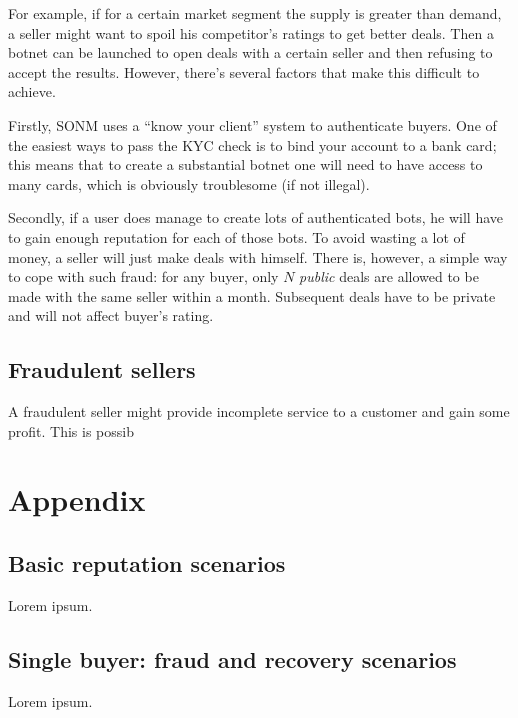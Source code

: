 \documentclass[11pt]{article}
\begin{document}
For example, if for a certain market segment the supply is greater than demand, a seller might want to spoil his competitor's ratings to get better deals. Then a botnet can be launched to open deals with a certain seller and then refusing to accept the results. However, there's several factors that make this difficult to achieve.

Firstly, SONM uses a ``know your client'' system to authenticate buyers. One of the easiest ways to pass the KYC check is to bind your account to a bank card; this means that to create a substantial botnet one will need to have access to many cards, which is obviously troublesome (if not illegal).

Secondly, if a user does manage to create lots of authenticated bots, he will have to gain enough reputation for each of those bots. To avoid wasting a lot of money, a seller will just make deals with himself. There is, however, a simple way to cope with such fraud: for any buyer, only $ N $ \textit{public} deals are allowed to be made with the same seller within a month. Subsequent deals have to be private and will not affect buyer's rating.

\subsection{Fraudulent sellers}

A fraudulent seller might provide incomplete service to a customer and gain some profit. This is possib

\section{Appendix} \label{appendix}

\subsection{Basic reputation scenarios} \label{appendix:basicReputation}

Lorem ipsum.

\subsection{Single buyer: fraud and recovery scenarios} \label{appendix:fraudAndRecovery}

Lorem ipsum.


\newpage
\end{document}
